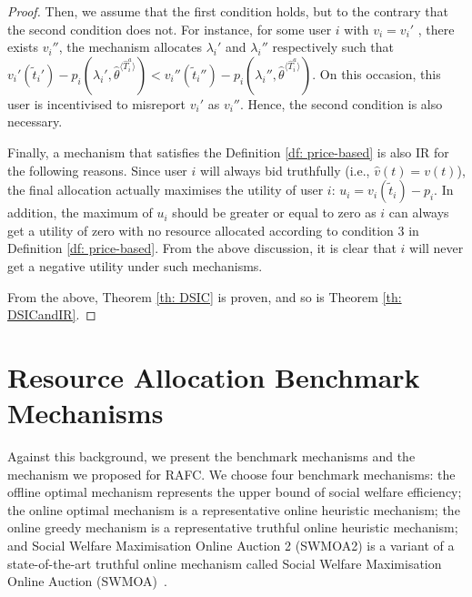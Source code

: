 \documentclass[11pt]{phdthesis}
\begin{document}
\begin{proof}
    Then, we assume that the first condition holds, but to the contrary that the second condition does not. For instance, for some user $ i $ with $ v_i = v_i'$ , there exists $v_i''$, the mechanism allocates $\lambda_i'$ and $\lambda_i''$ respectively such that $v_i' (\tilde{t}_i') - p_i(\lambda_i', \hat{\theta}^{\langle \hat{T}_i^a \rangle}) < v_i'' (\tilde{t}_i'') - p_i(\lambda_i'', \hat{\theta}^{\langle \hat{T}_i^a \rangle}) $. On this occasion, this user is incentivised to misreport  $v_i'$ as $ v_i'' $. Hence, the second condition is also necessary.
    
    Finally, a mechanism that satisfies the Definition \ref{df: price-based} is also IR for the following reasons. Since user $ i $ will always bid truthfully (i.e., $ \hat{v}(t) = v(t) $), the final allocation actually maximises the utility of user $i$: $ u_i = v_i(\tilde{t}_i)-p_i$. In addition, the maximum of $ u_i $ should be greater or equal to zero as $i$ can always get a utility of zero with no resource allocated according to condition 3 in Definition \ref{df: price-based}. From the above discussion, it is clear that $i$ will never get a negative utility under such mechanisms.
    
    From the above, Theorem \ref{th: DSIC} is proven, and so is Theorem \ref{th: DSICandIR}.
\end{proof}

\section{Resource Allocation Benchmark Mechanisms} \label{benchmarks}


Against this background, we present the benchmark mechanisms and the mechanism we proposed for RAFC. We choose four benchmark mechanisms: the offline optimal mechanism represents the upper bound of social welfare efficiency; the online optimal mechanism is a representative online heuristic mechanism; the online greedy mechanism is a representative truthful online heuristic mechanism; and Social Welfare Maximisation Online Auction 2 (SWMOA2) is a variant of a state-of-the-art truthful online mechanism called Social Welfare Maximisation Online Auction (SWMOA)~\citep{shi2017online}. 
\end{document}
